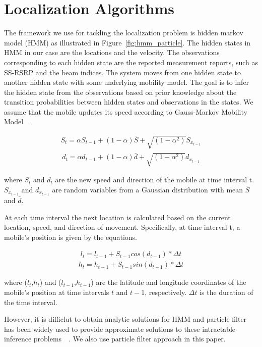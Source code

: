 \documentclass[conference, 10pt]{IEEEtran}
\begin{document}
\section{Localization Algorithms}
\label{sec:localalgo}

The framework we use for tackling the localization problem is hidden markov model (HMM) as illustrated 
in Figure~\ref{fig:hmm_particle}. The hidden states in HMM in our case are the locations and the velocity. 
The observations corresponding to each hidden state are the reported measurement reports, such as SS-RSRP and the beam indices.
The system moves from one hidden state to another hidden state with some underlying mobility model. 
The goal is to infer the hidden state from the observations based on
prior knowledge about the transition probabilities between hidden states and
observations in the states. We assume that the mobile updates its speed according to Gauss-Markov Mobility Model ~\cite{Camp2002}.

\begin{align}
S_t = \alpha S_{t-1}+(1-\alpha)\bar{S}+\sqrt{(1-\alpha^2)}S_{x_{t-1}}
\label{eqn:speed}
\end{align}
\begin{align}
d_t = \alpha d_{t-1}+(1-\alpha)\bar{d}+\sqrt{(1-\alpha^2)}d_{x_{t-1}}
\label{eqn:speed}
\end{align}

 where $S_t$ and $d_t$ are the new speed and direction of the mobile at time interval t. $S_{x_{t-1}}$ and $d_{x_{t-1}}$
 are random variables from a Gaussian distribution with mean $\bar{S}$ and $\bar{d}$.
 
 At each time interval the next location is calculated based on the current location, speed, and direction of movement.
Specifically, at time interval t, a mobile's position is given by the equations.

\begin{align}
	l_t = l_{t-1} +S_{t-1}cos(d_{t-1})*\Delta t
\label{eqn:mobilitymodelx}
\end{align}
\begin{align}
h_t = h_{t-1} +S_{t-1}sin(d_{t-1})*\Delta t
\label{eqn:mobilitymodely}
\end{align}

where ($l_t$,$h_t$) and ($l_{t-1}$,$h_{t-1}$) are the latitude and longitude coordinates of the mobile’s position 
at time intervals $t$ and $t-1$, respectively. $\Delta t$ is the duration of the time interval.

However, it is difficlut to obtain analytic solutions for HMM and particle filter has been widely used to provide approximate solutions to these intractable inference problems~\cite{doucet2009tutorial}~\cite{ThrunParticleFilter}.
We also use particle filter approach in this paper. 
\end{document}
